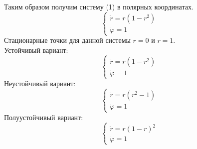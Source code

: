 \documentclass[12pt]{article}
\begin{document}
Таким образом получим систему (1) в полярных координатах.
\begin{equation}
  \begin{cases}
    \dot{r}=r(1-r^2)\\
    \dot{\varphi}=1
  \end{cases}
\end{equation}
Стационарные точки для данной системы $r=0$ и $r=1$.\\
Устойчивый вариант:
\begin{equation}
  \begin{cases}
    \dot{r}=r(1-r^2)\\
    \dot{\varphi}=1
  \end{cases}
\end{equation}
Неустойчивый вариант:
\begin{equation}
  \begin{cases}
    \dot{r}=r(r^2-1)\\
    \dot{\varphi}=1
  \end{cases}
\end{equation}
Полуустойчивый вариант:
\begin{equation}
  \begin{cases}
    \dot{r}=r(1-r)^2\\
    \dot{\varphi}=1
  \end{cases}
\end{equation}
\end{document}
